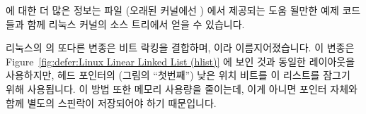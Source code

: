  에 대한 더 많은 정보는  파일 (오래된
커널에선 ) 에서 제공되는 도움 될만한 예제 코드들과 함께
리눅스 커널의 소스 트리에서 얻을 수 있습니다.

리눅스의  의 또다른 변종은 비트 락킹을 결합하며,  이라
이름지어졌습니다.
이 변종은
Figure~\ref{fig:defer:Linux Linear Linked List (hlist)}
에 보인 것과 동일한 레이아웃을 사용하지만, 헤드 포인터의 (그림의 ``첫번째'')
낮은 위치 비트를 이 리스트를 잠그기 위해 사용됩니다.
이 방법 또한 메모리 사용량을 줄이는데, 이게 아니면 포인터 자체와 함께 별도의
스핀락이 저장되어야 하기 때문입니다.

